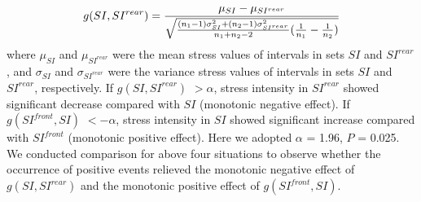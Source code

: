 \begin{equation}
\small{g(SI,SI^{rear})}= \frac{\mu_{SI}-\mu_{SI^{rear}}}{\sqrt{\frac{(n_1-1)\sigma^2_{SI}+(n_2-1)\sigma^2_{SI^{rear}}}{n_1+n_2-2}(\frac{1}{n_1}-\frac{1}{n_2})}}
\end{equation}
where $\mu_{SI}$ and $\mu_{SI^{rear}}$ were the mean stress values of intervals in sets $SI$ and $SI^{rear}$,
and $\sigma_{SI}$ and $\sigma_{SI^{rear}}$ were the variance stress values of intervals in sets $SI$ and $SI^{rear}$, respectively.
If $g(SI,SI^{rear})$ $> \alpha$, stress intensity in $SI^{rear}$ showed significant decrease compared with $SI$ (monotonic negative effect).
If $g(SI^{front},SI)$ $< -\alpha$, stress intensity in $SI$ showed significant increase compared with $SI^{front}$ (monotonic positive effect).
Here we adopted $\alpha$ = 1.96, $P$ = 0.025.
We conducted comparison for above four situations
to observe whether the occurrence of positive events relieved the monotonic negative effect of $g(SI,SI^{rear})$
and the monotonic positive effect of $g(SI^{front},SI)$.

